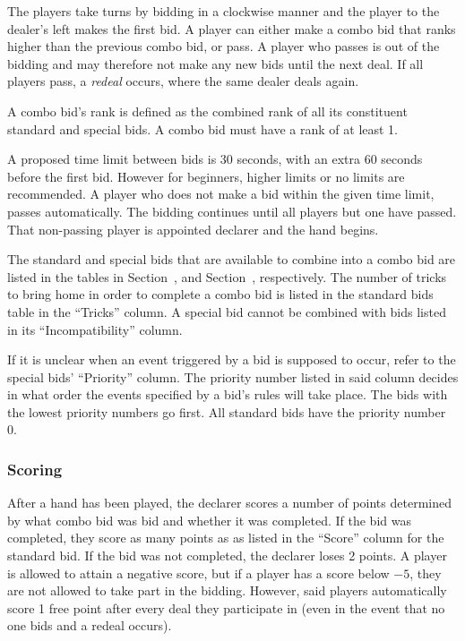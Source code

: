 \documentclass[a4paper]{article} %
\begin{document}
	The players take turns by bidding in a clockwise manner and the player to the dealer's left makes the first bid. A player can either make a combo bid that ranks higher than the previous combo bid, or pass. A player who passes is out of the bidding and may therefore not make any new bids until the next deal. If all players pass, a \emph{redeal} occurs, where the same dealer deals again.

	A combo bid's rank is defined as the combined rank of all its constituent standard and special bids. A combo bid must have a rank of at least 1.

	A proposed time limit between bids is 30 seconds, with an extra 60 seconds before the first bid. However for beginners, higher limits or no limits are recommended. A player who does not make a bid within the given time limit, passes automatically. The bidding continues until all players but one have passed. That non-passing player is appointed declarer and the hand begins.

	The standard and special bids that are available to combine into a combo bid are listed in the tables in Section~, and Section~, respectively. The number of tricks to bring home in order to complete a combo bid is listed in the standard bids table in the ``Tricks'' column. A special bid cannot be combined with bids listed in its ``Incompatibility'' column.

	If it is unclear when an event triggered by a bid is supposed to occur, refer to the special bids' ``Priority'' column. The priority number listed in said column decides in what order the events specified by a bid's rules will take place. The bids with the lowest priority numbers go first. All standard bids have the priority number 0.

	\subsubsection{Scoring}
	After a hand has been played, the declarer scores a number of points determined by what combo bid was bid and whether it was completed. If the bid was completed, they score as many points as as listed in the ``Score'' column for the standard bid. If the bid was not completed, the declarer loses 2 points. A player is allowed to attain a negative score, but if a player has a score below $-5$, they are not allowed to take part in the bidding. However, said players automatically score 1 free point after every deal they participate in (even in the event that no one bids and a redeal occurs).
\end{document}
